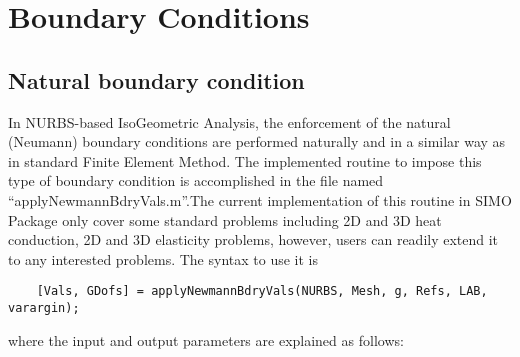 \section{Boundary Conditions}
\subsection{Natural boundary condition}
In NURBS-based IsoGeometric Analysis, the enforcement of the natural (Neumann) boundary conditions are performed naturally and in a similar way as in standard Finite Element Method. The implemented routine to impose this type of boundary condition is accomplished in the file named ``applyNewmannBdryVals.m''.The current implementation of this routine in SIMO Package only cover some standard problems including 2D and 3D heat conduction, 2D and 3D elasticity problems, however, users can readily extend it to any interested problems. The syntax to use it is
\begin{lstlisting}
    [Vals, GDofs] = applyNewmannBdryVals(NURBS, Mesh, g, Refs, LAB, varargin);
\end{lstlisting}
where the input and output parameters are explained as follows:

